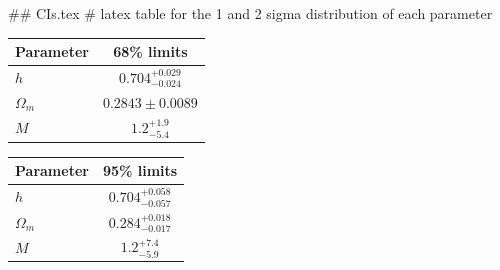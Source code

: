 ## CIs.tex
# latex table for the 1 and 2 sigma distribution of each parameter

\begin{tabular} { l  c}
 Parameter &  68\% limits\\
\hline
{\boldmath$h              $} & $0.704^{+0.029}_{-0.024}   $\\
{\boldmath$\Omega_m       $} & $0.2843\pm 0.0089          $\\
{\boldmath$M              $} & $1.2^{+1.9}_{-5.4}         $\\
\hline
\end{tabular}

\begin{tabular} { l  c}
 Parameter &  95\% limits\\
\hline
{\boldmath$h              $} & $0.704^{+0.058}_{-0.057}   $\\
{\boldmath$\Omega_m       $} & $0.284^{+0.018}_{-0.017}   $\\
{\boldmath$M              $} & $1.2^{+7.4}_{-5.9}         $\\
\hline
\end{tabular}
